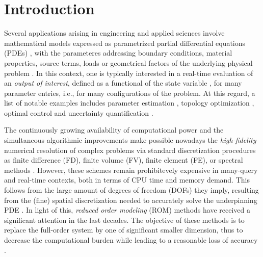 \documentclass[12pt, a4paper, twoside, openright, notitlepage]{report}
\numberwithin{equation}{chapter}
\theoremstyle{theorem}
\theoremstyle{definition}
\theoremstyle{remark}
\theoremstyle{proposition}
\numberwithin{figure}{chapter}
\newcommand{\NewPage}{\newpage\null\thispagestyle{empty}\newpage}
\begin{document}
	\NewPage
	
	
	\chapter*{Introduction}
	
		
		Several applications arising in engineering and applied sciences involve mathematical models expressed as parametrized partial differential equations (PDEs) \cite{HSR16}, with the parameteres addressing boundary conditions, material properties, source terms, loads or geometrical factors of the underlying physical problem \cite{Eft08}. In this context, one is typically interested in a real-time evaluation of an \emph{output of interest}, defined as a functional of the state variable \cite{Dep08}, for many parameter entries, i.e., for many configurations of the problem. At this regard, a list of notable examples includes parameter estimation \cite{Bro93}, topology optimization \cite{Ben04}, optimal control \cite{LM67} and uncertainty quantification \cite{LeM10}. 
		
		The continuously growing availability of computational power and the simultaneous algorithmic improvements make possible nowadays the \emph{high-fidelity} numerical resolution of complex problems via standard discretization procedures as finite difference (FD), finite volume (FV), finite element (FE), or spectral methods \cite{QMN15}. However, these schemes remain prohibitevely expensive in many-query and real-time contexts, both in terms of CPU time and memory demand. This follows from the large amount of degrees of freedom (DOFs) they imply, resulting from the (fine) spatial discretization needed to accurately solve the underpinning PDE \cite{Ams10}. In light of this, \emph{reduced order modeling} (ROM) methods have received a significant attention in the last decades. The objective of these methods is to replace the full-order system by one of significant smaller dimension, thus to decrease the computational burden while leading to a reasonable loss of accuracy \cite{Chen17}. 
		
\end{document}
